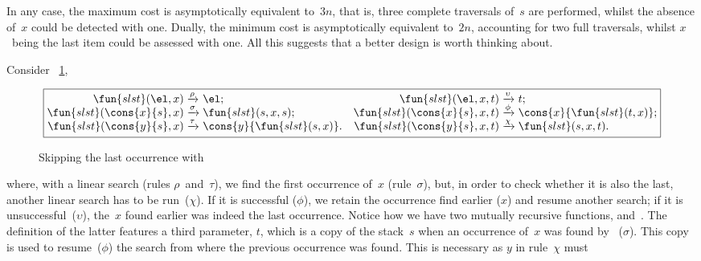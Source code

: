 In any case, the maximum cost is asymptotically equivalent to~\(3n\),
that is, three complete traversals of~\(s\) are performed, whilst the
absence of~\(x\) could be detected with one. Dually, the minimum cost
is asymptotically equivalent to~\(2n\), accounting for two full
traversals, whilst \(x\)~being the last item could be assessed with
one. All this suggests that a better design is worth thinking about.

Consider \fig~\ref{fig:slst},
\begin{figure}
\begin{equation*}
\boxed{%
\begin{array}{@{}r@{\;}l@{\;}lr@{\;}l@{\;}l@{}}
  \fun{slst}(\el,x)           & \xrightarrow{\smash{\rho}} & \el;
& \fun{slst}(\el,x,t)         & \xrightarrow{\smash{\upsilon}} & t;\\
  \fun{slst}(\cons{x}{s},x)   & \xrightarrow{\smash{\sigma}} &
                                           \fun{slst}(s,x,s);
& \fun{slst}(\cons{x}{s},x,t) & \xrightarrow{\smash{\phi}} &
                                           \cons{x}{\fun{slst}(t,x)};\\
  \fun{slst}(\cons{y}{s},x)   & \xrightarrow{\smash{\tau}} &
                                           \cons{y}{\fun{slst}(s,x)}.
& \fun{slst}(\cons{y}{s},x,t) & \xrightarrow{\smash{\chi}} &
                                           \fun{slst}(s,x,t).
\end{array}}
\end{equation*}
\caption{Skipping the last occurrence with }
\label{fig:slst}
\end{figure}
where, with a linear search (rules
\(\rho\)~and~\(\tau\)), we find the first occurrence of~\(x\)
(rule~\(\sigma\)), but, in order to check whether it is also the last,
another linear search has to be run~(\(\chi\)). If it is successful
(\(\phi\)), we retain the occurrence find earlier (\(x\)) and resume
another search; if it is unsuccessful~(\(\upsilon\)), the~\(x\) found
earlier was indeed the last occurrence.  Notice how we have two
mutually recursive functions, 
and~. The definition of the
latter features a third parameter, \(t\), which is a copy of the
stack~\(s\) when an occurrence of~\(x\) was found
by~ (\(\sigma\)). This copy is
used to resume~(\(\phi\)) the search from where the previous
occurrence was found. This is necessary as \(y\) in rule~\(\chi\) must
